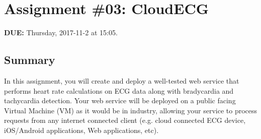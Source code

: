 
\usepackage{listings}
\usepackage{color}




\section*{Assignment \#03: CloudECG}

{\bf DUE:} Thursday, 2017-11-2 at 15:05.

\subsection*{Summary}

In this assignment, you will create and deploy a well-tested web service that performs heart rate calculations on ECG data along with bradycardia and tachycardia detection. Your web service will be deployed on a public facing Virtual Machine (VM) as it would be in industry, allowing your service to process requests from any internet connected client (e.g. cloud connected ECG device, iOS/Android applications, Web applications, etc).

